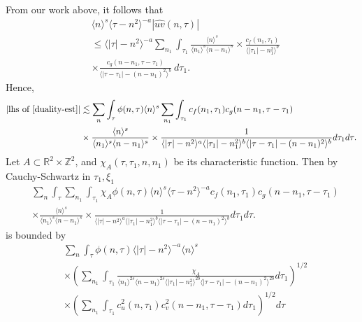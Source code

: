 \documentclass[12pt,reqno]{amsart}
\numberwithin{equation}{section}  %
\renewcommand{\cref}{\Cref}
\newcommand{\rr}{\mathbb{R}}
\newcommand{\zz}{\mathbb{Z}}
\newcommand{\wh}{\widehat}
\begin{document}
%
%
From our work above, it follows that 
%
%
\begin{equation}
	\label{convo-est-starting-pnt}
	\begin{split}
		 & \langle n \rangle^s \langle \tau - n^{2} \rangle^{-a} | \wh{uv}\left( 
		n, \tau \right) |
		\\
		& \le \langle |\tau| - n^{2} \rangle^{-a}
		\sum_{n_{1}} \int_{\tau_{1}} \frac{\langle n \rangle^{s}}{\langle n_1 \rangle^s
    \langle n - n_1 \rangle^s} 
		\times \frac{c_f(n_1, \tau_1)}{\langle |\tau_1| - n_1^{2} \rangle ^{b}}
		\\
		& \times
		\frac{c_g(n - n_1, \tau - \tau_1 )}{\langle |\tau - \tau_1| - (n - n_1)^{2}
    \rangle^{b}}\ d \tau_1.
	\end{split}
\end{equation}
%
%
Hence, 
%
%
\begin{equation}
  \label{pre-fubini-int-form}
	\begin{split}
    |\text{lhs of} \ \cref{duality-est}|
	& \lesssim \sum_{n} \int_{\tau} \phi(n, \tau) \langle n \rangle^s 
  \sum_{n_{1}}
  \int_{\tau_{1}} c_f(n_1, \tau_1)
		c_g(n - n_1, \tau - \tau_1 )
		\\
    & \times \frac{\langle n \rangle ^{s}}{\langle n_{1} \rangle ^{s} \langle
    n-n_{1} \rangle ^{s}} \times \frac{1}{\langle |\tau| - n^{2} \rangle
    ^{a}\langle |\tau_{1}|-n_{1}^{2} \rangle ^{b}\langle | \tau -
    \tau_{1}|-(n - n_{1})^{2}
    \rangle ^{b}} d \tau_1 d \tau.
	\end{split}
\end{equation}
%
Let $A \subset \rr^{2} \times \zz^{2}$, and $\chi_{A}(\tau, \tau_{1}, n, n_{1})$
be its
characteristic function. Then by Cauchy-Schwartz in
$\tau_{1}, \xi_{1}$
\begin{equation*}
	\begin{split}
    & \sum_{n} \int_{\tau}   \sum_{n_{1}}
    \int_{\tau_{1}} \chi_{A}
    \phi(n, \tau) \langle n \rangle^s \langle \tau - n^{2} \rangle^{-a}
  c_f(n_1, \tau_1)
		c_g(n - n_1, \tau - \tau_1 )
		\\
    & \times \frac{\langle n \rangle ^{s}}{\langle n_{1} \rangle ^{s} \langle
    n-n_{1} \rangle ^{s}} \times \frac{1}{\langle |\tau| - n^{2} \rangle
    ^{a}\langle |\tau_{1}|-n_{1}^{2} \rangle ^{b}\langle | \tau -
    \tau_{1}|-(n - n_{1})^{2}
    \rangle ^{b}} d \tau_1 d \tau.
	\end{split}
\end{equation*}
%
is bounded by 
%
%
\begin{equation}
	\label{10g}
	\begin{split}
    & \sum_{n} \int_{\tau} \phi(n, \tau) \langle | \tau | - n^{2} \rangle
    ^{-a} \langle n \rangle ^{s}
    \\
    & \times \left( \sum_{n_{1}} \int_{\tau_{1}}
    \frac{\chi_{A}}{\langle n_{1} \rangle ^{2s} \langle n-n_{1} \rangle ^{2s} \langle |
    \tau_{1} | - n_{1}^{2}\rangle^{2b}  \langle | \tau - \tau_{1} | -
    (n - n_{1})^{2} \rangle^{2b}} d \tau_{1} \right)^{1/2}
    \\
    & \times \left( \sum_{n_{1}} \int_{\tau_{1}} c_{u}^{2}(n, \tau_{1})
    c_{v}^{2}(n - n_{1}, \tau - \tau_{1}) d \tau_{1} \right)^{1/2} d \tau
  \end{split}
\end{equation}
\end{document}
